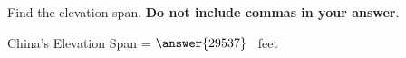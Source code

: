 \documentclass{ximera}[font=12pt]
\begin{document}
\begin{problem}
\begin{problem}
\begin{center}
\end{center}



\begin{multipleChoice}
\end{multipleChoice}


\begin{problem}
Find the elevation span.  \textbf{Do not include commas in your answer}.

China's Elevation Span =  $\answer{29537}$ \ feet

\end{problem}
\end{problem}
\end{problem}
\end{document}
